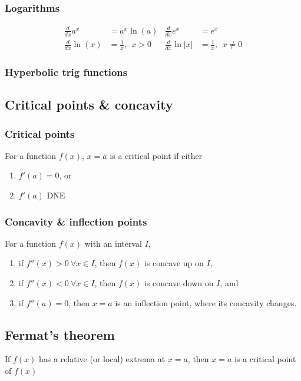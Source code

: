 \documentclass[main.tex]{subfiles}
\begin{document}
\begin{multicols}{2}
	\subsubsection*{Logarithms}
	\begin{align*}
		\frac{d}{dx} a^x &= a^x \ln{(a)} & \frac{d}{dx} e^x &= e^x \\
		\frac{d}{dx} \ln{(x)} &= \frac{1}{x}, \ \ x > 0 & \frac{d}{dx} \ln{|x|} &= \frac{1}{x}, \ \ x \neq 0
	\end{align*}

	\subsubsection*{Hyperbolic trig functions}

	\subsection*{Critical points \& concavity}
	\subsubsection*{Critical points}
	For a function \(f(x)\), \(x = a\) is a critical point if either
	\begin{enumerate}
		\item \(f'(a) = 0\), or
		\item \(f'(a)\) DNE
	\end{enumerate}

	\subsubsection*{Concavity \& inflection points}
	For a function \(f(x)\) with an interval \(I\),
	\begin{enumerate}
		\item if \(f''(x) > 0 \ \forall x \in I\), then \(f(x)\) is concave up on \(I\),
		\item if \(f''(x) < 0 \ \forall x \in I\), then \(f(x)\) is concave down on \(I\), and
		\item if \(f''(a) = 0\), then \(x = a\) is an inflection point, where its concavity changes.
	\end{enumerate}

	\subsection*{Fermat's theorem}
	\begin{theorem}
	If \(f(x)\) has a relative (or local) extrema at \(x = a\), then \(x = a\) is a critical point of \(f(x)\)
	\end{theorem}


\end{multicols}
\end{document}
